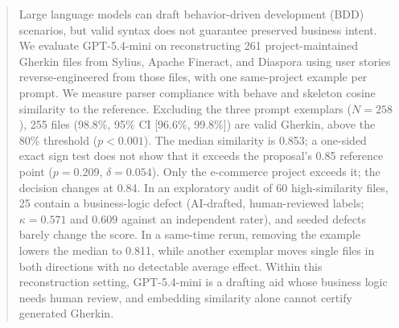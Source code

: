 \begin{abstract}
Large language models can draft behavior-driven development (BDD) scenarios, but valid syntax does not guarantee preserved business intent. We evaluate GPT-5.4-mini on reconstructing 261 project-maintained Gherkin files from Sylius, Apache Fineract, and Diaspora using user stories reverse-engineered from those files, with one same-project example per prompt. We measure parser compliance with behave and skeleton cosine similarity to the reference. Excluding the three prompt exemplars ($N = 258$), 255 files (98.8\%, 95\% CI [96.6\%, 99.8\%]) are valid Gherkin, above the 80\% threshold ($p < 0.001$). The median similarity is 0.853; a one-sided exact sign test does not show that it exceeds the proposal's 0.85 reference point ($p = 0.209$, $\delta = 0.054$). Only the e-commerce project exceeds it; the decision changes at 0.84. In an exploratory audit of 60 high-similarity files, 25 contain a business-logic defect (AI-drafted, human-reviewed labels; $\kappa = 0.571$ and $0.609$ against an independent rater), and seeded defects barely change the score. In a same-time rerun, removing the example lowers the median to 0.811, while another exemplar moves single files in both directions with no detectable average effect. Within this reconstruction setting, GPT-5.4-mini is a drafting aid whose business logic needs human review, and embedding similarity alone cannot certify generated Gherkin.

\end{abstract}
